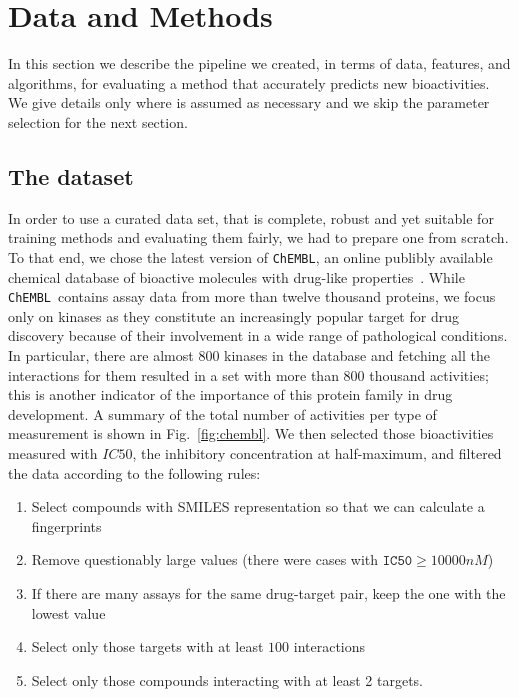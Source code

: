 \documentclass[10pt]{article}
\newcommand{\chembl}{\texttt{ChEMBL}}
\begin{document}
\section{Data and Methods}
\label{s:methods}
In this section we describe the pipeline we created, in terms of data, features, and algorithms, for evaluating a method that accurately predicts new bioactivities. We give details only where is assumed as necessary and we skip the parameter selection for the next section. 


\subsection{The dataset}
\label{ss:dataset}

In order to use a curated data set, that is complete, robust and yet suitable for training methods and evaluating them fairly, we had to prepare one from scratch. To that end, we chose the latest version of \chembl, an online publibly available chemical database of bioactive molecules with drug-like properties~\cite{davies2015chembl,bento2014chembl,gaulton2011chembl}. While \chembl \ contains assay data from more than twelve thousand proteins, we focus only on kinases as they constitute an increasingly popular target for drug discovery because of their involvement in a wide range of pathological conditions. In particular, there are almost $800$ kinases in the database and fetching all the interactions for them resulted in a set with more than $800$ thousand activities; this is another indicator of the importance of this protein family in drug development. A summary of the total number of activities per type of measurement is shown in Fig.~\ref{fig:chembl}. We then selected those bioactivities measured with $IC50$, the inhibitory concentration at half-maximum, and filtered the data according to the following rules:
\begin{enumerate}
	\setlength\itemsep{0.5mm}
	\item Select compounds with SMILES representation so that we can calculate a fingerprints
	\item Remove questionably large values (there were cases with $\texttt{IC50} \geq 10000 nM$) 
	\item If there are many assays for the same drug-target pair, keep the one with the lowest value
	\item Select only those targets with at least $100$ interactions 
	\item Select only those compounds interacting with at least 2 targets.
\end{enumerate}
\end{document}
